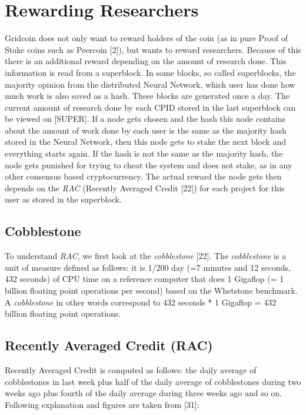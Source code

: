 \section{Rewarding Researchers}

Gridcoin does not only want to reward holders of the coin (as in pure Proof of Stake coins such as Peercoin [2]), but wants to reward researchers. Because of this there is an additional reward depending on the amount of research done. This information is read from a superblock. In some blocks, so called superblocks, the majority opinion from the distributed Neural Network, which user has done how much work is also saved as a hash. These blocks are generated once a day. The current amount of research done by each CPID stored in the last superblock can be viewed on [SUPER]. If a node gets chosen and the hash this node contains about the amount of work done by each user is the same as the majority hash stored in the Neural Network, then this node gets to stake the next block and everything starts again. If the hash is not the same as the majority hash, the node gets punished for trying to cheat the system and does not stake, as in any other consensus based cryptocurrency. The actual reward the node gets then depends on the \textit{RAC} (Recently Averaged Credit [22]) for each project for this user as stored in the superblock.\\

\subsection{Cobblestone}

To understand \textit{RAC}, we first look at the \textit{cobblestone} [22]. The \textit{cobblestone} is a unit of measure defined as follows: it is 1/200 day (=7 minutes and 12 seconds, 432 seconds) of CPU time on a reference computer that does 1 Gigaflop (= 1 billion floating point operations per second) based on the Whetstone benchmark. A \textit{cobblestone} in other words correspond to 432 seconds * 1 Gigaflop = 432 billion floating point operations.\\


\subsection{Recently Averaged Credit (RAC)}

Recently Averaged Credit is computed as follows: the daily average of cobblestones in last week plus half of the daily average of cobblestones during two weeks ago plus fourth of the daily average during three weeks ago and so on. Following explanation and figures are taken from [31]:\\

